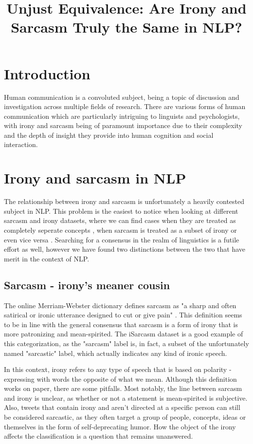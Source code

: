 \documentclass[10pt, a4paper]{article}
\title{Unjust Equivalence: Are Irony and Sarcasm Truly the Same in NLP?}
\begin{document}
\maketitleabstract

\section{Introduction}

Human communication is a convoluted subject, being a topic of discussion and investigation across multiple fields of research.
There are various forms of human communication which are particularly intriguing to linguists and psychologists, 
with irony and sarcasm being of paramount importance due to their complexity and the depth of insight they provide 
into human cognition and social interaction.

\section{Irony and sarcasm in NLP}
The relationship between irony and sarcasm is unfortunately a heavily contested subject in NLP. This problem is the easiest
to notice when looking at different sarcasm and irony datasets, where we can find cases when they are treated as completely
seperate concepts \citep{kaggle-tweets}, when sarcasm is treated as a subset of irony \citep{semeval-2018} or even vice
versa \citep{iSarcasm}. Searching for a consensus in the realm of linguistics is a futile effort as well, however we have 
found two distinctions between the two that have merit in the context of NLP.

\subsection{Sarcasm - irony's meaner cousin}
The online Merriam-Webster dictionary defines sarcasm as "a sharp and often satirical or ironic utterance designed to 
cut or give pain" \citep{mw-dictionary}. This definition seems to be in line with the general consensus that sarcasm is
a form of irony that is more patronizing and mean-spirited. The iSarcasm dataset \citep{iSarcasm} is a good example of this 
categorization, as the "sarcasm" label is, in fact, a subset of the unfortunately named "sarcastic" label, which actually 
indicates any kind of ironic speech. 

In this context, irony refers to any type of speech that is based on polarity -
expressing with words the opposite of what we mean. Although this definition works on paper, there are some pitfalls.
Most notably, the line between sarcasm and irony is unclear, as whether or not a statement is mean-spirited is subjective.
Also, tweets that contain irony and aren't directed at a specific person can still be considered sarcastic, as they often
target a group of people, concepts, ideas or themselves in the form of self-deprecating humor. How the object of the irony
affects the classification is a question that remains unanswered.
\end{document}
